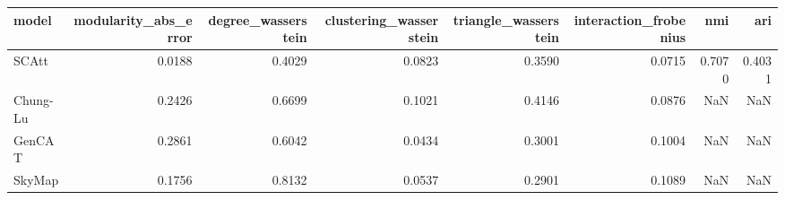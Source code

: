 \begin{tabular}{lrrrrrrr}
\toprule
model & modularity_abs_error & degree_wasserstein & clustering_wasserstein & triangle_wasserstein & interaction_frobenius & nmi & ari \\
\midrule
SCAtt & 0.0188 & 0.4029 & 0.0823 & 0.3590 & 0.0715 & 0.7070 & 0.4031 \\
Chung-Lu & 0.2426 & 0.6699 & 0.1021 & 0.4146 & 0.0876 & NaN & NaN \\
GenCAT & 0.2861 & 0.6042 & 0.0434 & 0.3001 & 0.1004 & NaN & NaN \\
SkyMap & 0.1756 & 0.8132 & 0.0537 & 0.2901 & 0.1089 & NaN & NaN \\
\bottomrule
\end{tabular}
